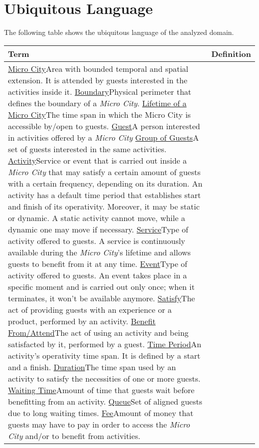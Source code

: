 \section{Ubiquitous Language}

The following table shows the ubiquitous language of the analyzed domain.

\begin{table}[H]
    \centering
    \begin{tabular}{|l|p{}|}
        \hline
        \textbf{Term} & \textbf{Definition}\\
        \hline
        \ul{Micro City}{Area with bounded temporal and spatial extension. It is attended by guests interested in the activities inside it.}
        \ul{Boundary}{Physical perimeter that defines the boundary of a \textit{Micro City}.}
        \ul{Lifetime of a Micro City}{The time span in which the Micro City is accessible by/open to guests.}
        \ul{Guest}{A person interested in activities offered by a \textit{Micro City}}
        \ul{Group of Guests}{A set of guests interested in the same activities.}
        \ul{Activity}{Service or event that is carried out inside a \textit{Micro City} that may satisfy a certain amount of guests with a certain frequency, depending on its duration. An activity has a default time period that establishes start and finish of its operativity. Moreover, it may be static or dynamic. A static activity cannot move, while a dynamic one may move if necessary.}
        \ul{Service}{Type of activity offered to guests. A service is continuously available during the \textit{Micro City}'s lifetime and allows guests to benefit from it at any time.}
        \ul{Event}{Type of activity offered to guests. An event takes place in a specific moment and is carried out only once; when it terminates, it won't be available anymore.}
        \ul{Satisfy}{The act of providing guests with an experience or a product, performed by an activity.}
        \ul{Benefit From/Attend}{The act of using an activity and being satisfacted by it, performed by a guest.}
        \ul{Time Period}{An activity's operativity time span. It is defined by a start and a finish.}
        \ul{Duration}{The time span used by an activity to satisfy the necessities of one or more guests.}
        \ul{Waiting Time}{Amount of time that guests wait before benefitting from an activity.}
        \ul{Queue}{Set of aligned guests due to long waiting times.}
        \ul{Fee}{Amount of money that guests may have to pay in order to access the \textit{Micro City} and/or to benefit from activities.}

\end{tabular}
\end{table}
